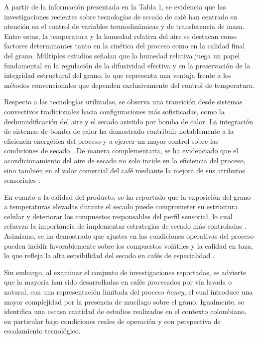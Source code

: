 A partir de la información presentada en la Tabla 1, se evidencia que las investigaciones recientes 
sobre tecnologías de secado de café han centrado su atención en el control de variables 
termodinámicas y de transferencia de masa. Entre estas, la temperatura y la humedad relativa del 
aire se destacan como factores determinantes tanto en la cinética del proceso como en la calidad 
final del grano. Múltiples estudios señalan que la humedad relativa juega un papel fundamental en 
la regulación de la difusividad efectiva y en la preservación de la integridad estructural del 
grano, lo que representa una ventaja frente a los métodos convencionales que dependen 
exclusivamente del control de temperatura.

Respecto a las tecnologías utilizadas, se observa una transición desde sistemas convectivos 
tradicionales hacia configuraciones más sofisticadas, como la deshumidificación del aire y el 
secado asistido por bomba de calor. La integración de sistemas de bomba de calor ha demostrado 
contribuir notablemente a la eficiencia energética del proceso y a ejercer un mayor control sobre 
las condiciones de secado \parencite{dzaky_activation_2022, fauzi_influence_2024}. De manera 
complementaria, se ha evidenciado que el acondicionamiento del aire de secado no solo incide en 
la eficiencia del proceso, sino también en el valor comercial del café mediante la mejora de sus 
atributos sensoriales \parencite{konopatzki_price_2019}.

En cuanto a la calidad del producto, se ha reportado que la exposición del grano a temperaturas 
elevadas durante el secado puede comprometer su estructura celular y deteriorar los compuestos 
responsables del perfil sensorial, lo cual refuerza la importancia de implementar estrategias de 
secado más controladas \parencite{borem_quality_2018, abreu_influence_2025}. Asimismo, se ha 
demostrado que ajustes en las condiciones operativas del proceso pueden incidir favorablemente 
sobre los compuestos volátiles y la calidad en taza, lo que refleja la alta sensibilidad del 
secado en cafés de especialidad \parencite{parra-coronado_preliminary_2020}.

Sin embargo, al examinar el conjunto de investigaciones reportadas, se advierte que la mayoría han 
sido desarrolladas en cafés procesados por vía lavada o natural, con una representación limitada 
del proceso \textit{honey}, el cual introduce una mayor complejidad por la presencia de mucílago 
sobre el grano. Igualmente, se identifica una escasa cantidad de estudios realizados en el contexto 
colombiano, en particular bajo condiciones reales de operación y con perspectiva de escalamiento 
tecnológico.

